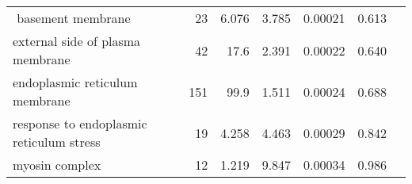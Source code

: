 \begin{longtable}{|l|r|r|r|r|r|}
$$                                 basement membrane &                      23 &                   6.076 &      3.785 &              0.00021 &                        0.613~~ \\
                  external side of plasma membrane &                      42 &                    17.6 &      2.391 &              0.00022 &                        0.640~~ \\
                    endoplasmic reticulum membrane &                     151 &                    99.9 &      1.511 &              0.00024 &                        0.688~~ \\
          response to endoplasmic reticulum stress &                      19 &                   4.258 &      4.463 &              0.00029 &                        0.842~~ \\
                                    myosin complex &                      12 &                   1.219 &      9.847 &              0.00034 &                        0.986~~ \\
\end{longtable}
